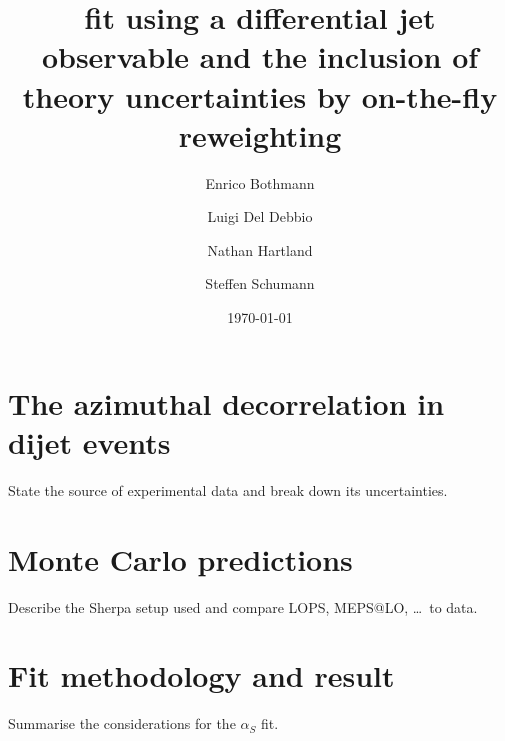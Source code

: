 \documentclass[a4paper]{scrartcl}
\title{\alphas fit using a differential jet observable and the inclusion of
theory uncertainties by on-the-fly reweighting}
\author{Enrico Bothmann \and Luigi Del Debbio \and Nathan Hartland \and Steffen
Schumann}
\date{\today}
\newcommand{\alphas}{\ensuremath{\alpha_S}\xspace}
\begin{document}
\maketitle
\section{The azimuthal decorrelation in dijet events}
State the source of experimental data and break down its uncertainties.
\cite{Khachatryan:2011zj,Khachatryan:2016hkr}
\section{Monte Carlo predictions}
Describe the Sherpa setup used and compare LOPS, MEPS@LO, \dots\ to data.
\section{Fit methodology and result}
Summarise the considerations for the \alphas fit.



\end{document}
